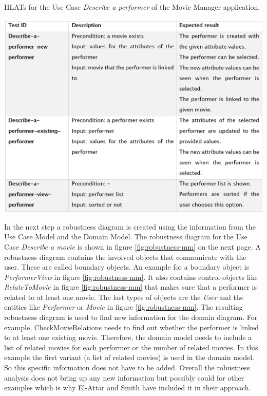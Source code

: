 \begin{table}[H]
	\caption{HLATs for the Use Case \textit{Describe a performer} of the Movie Manager application.}	
	\centering
	\includegraphics[width=.9\textwidth]{../images/ElAttarHLATs.png}
	\label{fig:hlats-mm}
\end{table}

In the next step a robustness diagram is created using the information from the Use Case Model and the Domain Model.
The robustness diagram for the Use Case \textit{Describe a movie} is shown in figure \ref{fig:robustness-mm} on the next page.
A robustness diagram contains the involved objects that communicate with the user.
These are called boundary objects.
An example for a boundary object is \textit{PerformerView} in figure \ref{fig:robustness-mm}.
It also contains control-objects like \textit{RelateToMovie} in figure \ref{fig:robustness-mm} that makes sure that a performer is related to at least one movie.
The last types of objects are the \textit{User} and the entities like \textit{Performer} or \textit{Movie} in figure \ref{fig:robustness-mm}.
The resulting robustness diagram is used to find new information for the domain diagram.
For example, CheckMovieRelations needs to find out whether the performer is linked to at least one existing movie.
Therefore, the domain model needs to include a list of related movies for each performer or the number of related movies.
In this example the first variant (a list of related movies) is used in the domain model.
So this specific information does not have to be added.
Overall the robustness analysis does not bring up any new information but possibly could for other examples which is why El-Attar and Smith have included it in their approach.


